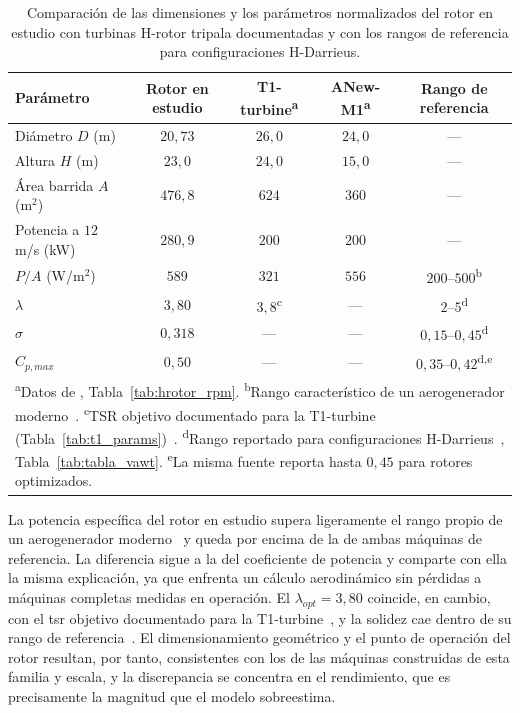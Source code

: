 \begin{table}[H]
    \centering
    \caption[Comparación del rotor en estudio con turbinas H-rotor documentadas.]{Comparación de las dimensiones y los parámetros normalizados del rotor en estudio con turbinas H-rotor tripala documentadas y con los rangos de referencia para configuraciones H-Darrieus.}
    \label{tab:comparacion_adim}
    \begin{tabular}{lcccc}
        \hline
        \textbf{Parámetro} & \textbf{Rotor en estudio} & \textbf{T1-turbine}\textsuperscript{a} & \textbf{ANew-M1}\textsuperscript{a} & \textbf{Rango de referencia}\\
        \hline
        Diámetro $D$ (m)         & $20{,}73$ & $26{,}0$ & $24{,}0$ & ---\\
        Altura $H$ (m)           & $23{,}0$  & $24{,}0$ & $15{,}0$ & ---\\
        Área barrida $A$ (m$^2$) & $476{,}8$ & $624$    & $360$ & ---\\
        Potencia a $12$ m/s (kW) & $280{,}9$ & $200$    & $200$ & ---\\
        $P/A$ (W/m$^2$)          & $589$     & $321$    & $556$ & $200$--$500$\textsuperscript{b}\\
        $\lambda$                & $3{,}80$  & $3{,}8$\textsuperscript{c} & --- & $2$--$5$\textsuperscript{d}\\
        $\sigma$                 & $0{,}318$ & ---      & --- & $0{,}15$--$0{,}45$\textsuperscript{d}\\
        $C_{p,max}$          & $0{,}50$  & ---      & --- & $0{,}35$--$0{,}42$\textsuperscript{d,e}\\
        \hline
        \multicolumn{5}{p{0.95\textwidth}}{\footnotesize \textsuperscript{a}Datos de \textcite{Mollerstrom2019}, Tabla~\ref{tab:hrotor_rpm}. \textsuperscript{b}Rango característico de un aerogenerador moderno~\parencite{Mollerstrom2019}. \textsuperscript{c}TSR objetivo documentado para la T1-turbine (Tabla~\ref{tab:t1_params})~\parencite{Mollerstrom2017,Mollerstrom2016}. \textsuperscript{d}Rango reportado para configuraciones H-Darrieus~\parencite{Essahraoui2026}, Tabla~\ref{tab:tabla_vawt}. \textsuperscript{e}La misma fuente reporta hasta $0{,}45$ para rotores optimizados.}
    \end{tabular}
\end{table}

La potencia específica del rotor en estudio supera ligeramente el rango propio de un aerogenerador moderno~\parencite{Mollerstrom2019} y queda por encima de la de ambas máquinas de referencia. La diferencia sigue a la del coeficiente de potencia y comparte con ella la misma explicación, ya que enfrenta un cálculo aerodinámico sin pérdidas a máquinas completas medidas en operación. El $\lambda_{opt} = 3{,}80$ coincide, en cambio, con el \gls{tsr} objetivo documentado para la T1-turbine~\parencite{Mollerstrom2017}, y la solidez cae dentro de su rango de referencia~\parencite{Essahraoui2026}. El dimensionamiento geométrico y el punto de operación del rotor resultan, por tanto, consistentes con los de las máquinas construidas de esta familia y escala, y la discrepancia se concentra en el rendimiento, que es precisamente la magnitud que el modelo sobreestima.

